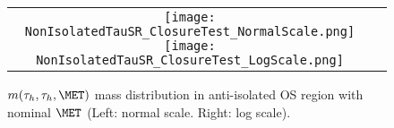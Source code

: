 

 \begin{figure}[tbhp!]
      \centering
      \begin{tabular}{cc}
        \texttt{[image: NonIsolatedTauSR\_ClosureTest\_NormalScale.png]}
        \texttt{[image: NonIsolatedTauSR\_ClosureTest\_LogScale.png]}
      \end{tabular}
     \caption{$m(\tau_{h},\tau_{h},\MET)$ mass distribution in anti-isolated OS region with nominal $\MET$ (Left: normal scale.  Right: log scale).}
    \label{fig:MG306}
 \end{figure}
 
